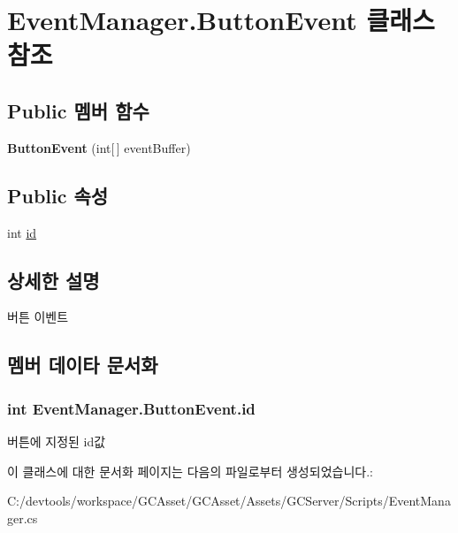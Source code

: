 \hypertarget{class_event_manager_1_1_button_event}{}\section{Event\+Manager.\+Button\+Event 클래스 참조}
\label{class_event_manager_1_1_button_event}
\subsection*{Public 멤버 함수}
\begin{DoxyCompactItemize}
\item 
\hypertarget{class_event_manager_1_1_button_event_a561644b31749f8f934620e88758335f6}{}{\bfseries Button\+Event} (int\mbox{[}$\,$\mbox{]} event\+Buffer)\label{class_event_manager_1_1_button_event_a561644b31749f8f934620e88758335f6}

\end{DoxyCompactItemize}
\subsection*{Public 속성}
\begin{DoxyCompactItemize}
\item 
int \hyperlink{class_event_manager_1_1_button_event_a1f2370e652753ea15df364cd3df7df2e}{id}
\end{DoxyCompactItemize}


\subsection{상세한 설명}
버튼 이벤트 

\subsection{멤버 데이타 문서화}
\hypertarget{class_event_manager_1_1_button_event_a1f2370e652753ea15df364cd3df7df2e}{}
\subsubsection[{id}]{\setlength{\rightskip}{0pt plus 5cm}int Event\+Manager.\+Button\+Event.\+id}\label{class_event_manager_1_1_button_event_a1f2370e652753ea15df364cd3df7df2e}
버튼에 지정된 id값 

이 클래스에 대한 문서화 페이지는 다음의 파일로부터 생성되었습니다.\+:\begin{DoxyCompactItemize}
\item 
C\+:/devtools/workspace/\+G\+C\+Asset/\+G\+C\+Asset/\+Assets/\+G\+C\+Server/\+Scripts/Event\+Manager.\+cs\end{DoxyCompactItemize}
